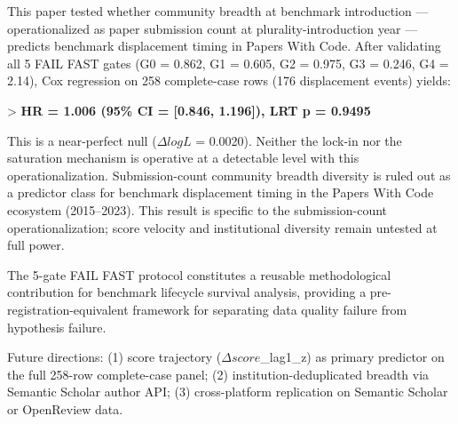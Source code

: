 
This paper tested whether community breadth at benchmark introduction --- operationalized as paper submission count at plurality-introduction year --- predicts benchmark displacement timing in Papers With Code. After validating all 5 FAIL FAST gates (G0 = 0.862, G1 = 0.605, G2 = 0.975, G3 = 0.246, G4 = 2.14), Cox regression on 258 complete-case rows (176 displacement events) yields:

> \textbf{HR = 1.006 (95\% CI = [0.846, 1.196]), LRT p = 0.9495}

This is a near-perfect null ($\Delta logL$ = 0.0020). Neither the lock-in nor the saturation mechanism is operative at a detectable level with this operationalization. Submission-count community breadth diversity is ruled out as a predictor class for benchmark displacement timing in the Papers With Code ecosystem (2015--2023). This result is specific to the submission-count operationalization; score velocity and institutional diversity remain untested at full power.

The 5-gate FAIL FAST protocol constitutes a reusable methodological contribution for benchmark lifecycle survival analysis, providing a pre-registration-equivalent framework for separating data quality failure from hypothesis failure.

Future directions: (1) score trajectory ($\Delta score$\_lag1\_z) as primary predictor on the full 258-row complete-case panel; (2) institution-deduplicated breadth via Semantic Scholar author API; (3) cross-platform replication on Semantic Scholar or OpenReview data.

